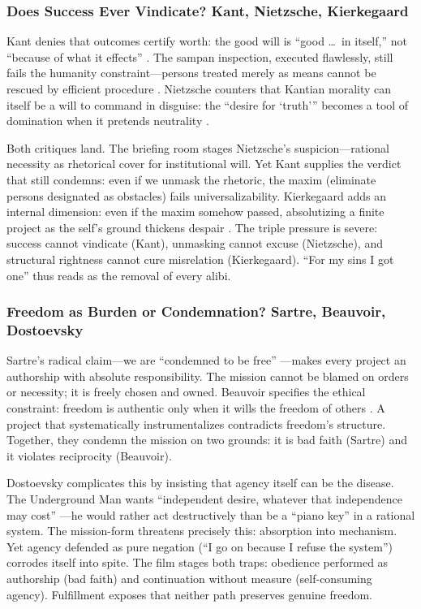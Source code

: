 \subsubsection*{Does Success Ever Vindicate? Kant, Nietzsche, Kierkegaard}

Kant denies that outcomes certify worth: the good will is ``good \ldots\ in itself,'' not
``because of what it effects'' \parencite[p.~27]{KantGroundwork1996}. The sampan inspection,
executed flawlessly, still fails the humanity constraint---persons treated merely as means
cannot be rescued by efficient procedure \parencite[pp.~36--37]{KantCPrR1996}. Nietzsche
counters that Kantian morality can itself be a will to command in disguise: the ``desire for
`truth''' becomes a tool of domination when it pretends neutrality \parencite[\S 34]{NietzscheBGE1990}.

Both critiques land. The briefing room stages Nietzsche's suspicion---rational necessity as
rhetorical cover for institutional will. Yet Kant supplies the verdict that still condemns:
even if we unmask the rhetoric, the maxim (eliminate persons designated as obstacles) fails
universalizability. Kierkegaard adds an internal dimension: even if the maxim somehow passed,
absolutizing a finite project as the self's ground thickens despair
\parencite[pp.~69--83]{KierkegaardSUD1980}. The triple pressure is severe: success cannot
vindicate (Kant), unmasking cannot excuse (Nietzsche), and structural rightness cannot cure
misrelation (Kierkegaard). ``For my sins I got one'' thus reads as the removal of every alibi.

\subsubsection*{Freedom as Burden or Condemnation? Sartre, Beauvoir, Dostoevsky}

Sartre's radical claim---we are ``condemned to be free'' \parencite[pp.~34--36]{SartreBN2003}---makes
every project an authorship with absolute responsibility. The mission cannot be blamed on
orders or necessity; it is freely chosen and owned. Beauvoir specifies the ethical constraint:
freedom is authentic only when it wills the freedom of others \parencite[p.~73]{Beauvoir1976}.
A project that systematically instrumentalizes contradicts freedom's structure. Together, they
condemn the mission on two grounds: it is bad faith (Sartre) and it violates reciprocity
(Beauvoir).

Dostoevsky complicates this by insisting that agency itself can be the disease. The
Underground Man wants ``independent desire, whatever that independence may cost''
\parencite[p.~131]{DostoevskyNFU1994}---he would rather act destructively than be a ``piano
key'' in a rational system. The mission-form threatens precisely this: absorption into
mechanism. Yet agency defended as pure negation (``I go on because I refuse the system'')
corrodes itself into spite. The film stages both traps: obedience performed as authorship
(bad faith) and continuation without measure (self-consuming agency). Fulfillment exposes that
neither path preserves genuine freedom.

